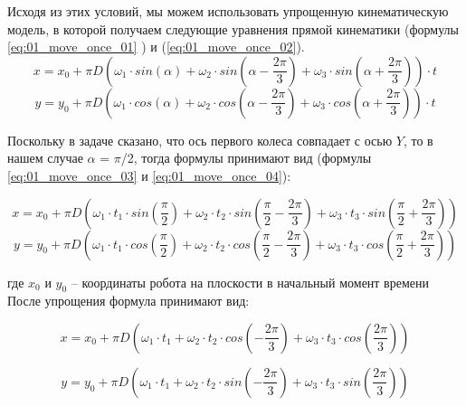 Исходя из этих условий, мы можем использовать упрощенную кинематическую модель, в которой получаем следующие уравнения прямой кинематики (формулы \ref{eq:01_move_once_01} ) и (\ref{eq:01_move_once_02}).
\begin{equation}
	x = x_0 + \pi D \left(
	\omega_1\cdot sin(\alpha) + 
	\omega_2\cdot sin\left(\alpha-\frac{2\pi}{3} \right) + 
	\omega_3\cdot sin\left(\alpha+\frac{2\pi}{3} \right)\right) \cdot t
	\label{eq:01_move_once_01}
\end{equation}
\begin{equation}
	y = y_0 + \pi D\left(
	\omega_1\cdot cos(\alpha) + 
	\omega_2\cdot cos\left(\alpha-\frac{2\pi}{3} \right) + 
	\omega_3\cdot cos\left(\alpha+\frac{2\pi}{3} \right)\right) \cdot t
	\label{eq:01_move_once_02}
\end{equation}

Поскольку в задаче сказано, что ось первого колеса совпадает с осью $Y$, то в нашем случае $\alpha$ = $\pi$/2, тогда формулы принимают вид (формулы \ref{eq:01_move_once_03} и \ref{eq:01_move_once_04}):

\begin{equation}
	x = x_0 + \pi D\left(
	\omega_1 \cdot t_1 \cdot sin\left(\frac{\pi}{2}\right) + 
	\omega_2 \cdot t_2 \cdot sin\left(\frac{\pi}{2} - \frac{2\pi}{3}\right) + \omega_3 \cdot t_3 \cdot sin\left(\frac{\pi}{2} + \frac{2\pi}{3}\right)\right)
	\label{eq:01_move_once_03}
\end{equation}
\begin{equation}
	y = y_0 + \pi D\left(
	\omega_1 \cdot t_1 \cdot cos\left(\frac{\pi}{2}\right) + 
	\omega_2 \cdot t_2 \cdot cos\left(\frac{\pi}{2} - \frac{2\pi}{3}\right) + \omega_3 \cdot t_3 \cdot cos\left(\frac{\pi}{2} + \frac{2\pi}{3}\right)\right)
	\label{eq:01_move_once_04}
\end{equation}

где $x_0$ и $y_0$ – координаты робота на плоскости в начальный момент времени\\

После упрощения формула принимают вид: 

\begin{equation}
	x = x_0 + \pi D\left(
	\omega_1 \cdot t_1 + 
	\omega_2 \cdot t_2 \cdot cos\left(-\frac{2\pi}{3}\right) +
	\omega_3 \cdot t_3 \cdot cos\left(\frac{2\pi}{3}\right) \right)
	\label{eq:01_move_once_05}
\end{equation}

\begin{equation}
	y = y_0 + \pi D\left(
	\omega_1 \cdot t_1 + 
	\omega_2 \cdot t_2 \cdot sin\left(-\frac{2\pi}{3}\right) +
	\omega_3 \cdot t_3 \cdot sin\left(\frac{2\pi}{3}\right) \right)
	\label{eq:01_move_once_06}
\end{equation}

